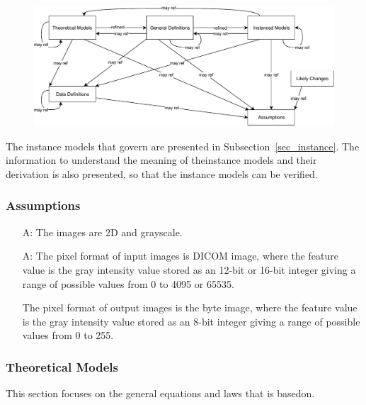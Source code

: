 \documentclass[12pt]{article}
\begin{document}
\begin{figure}[H]
  \includegraphics[scale=0.9]{RelationsBetweenTM_GD_IM_DD_A.pdf}
\end{figure}

The instance models that govern \progname{} are presented in
Subsection~\ref{sec_instance}. The information to understand the meaning of
theinstance models and their derivation is also presented, so that the instance
models can be verified.

\subsubsection{Assumptions}
\label{sec_assumpt}

\begin{itemize}

\item[A\refstepcounter{assumpnum}\theassumpnum \label{A_2Dgrayscale}:]
The images are 2D and grayscale.

\item[A\refstepcounter{assumpnum}\theassumpnum \label{A_8bitinteger}:]
The pixel format of input images is DICOM image, where the feature value is the
gray intensity value stored as an 12-bit or 16-bit integer giving a range of
possible values from 0 to 4095 or 65535.

The pixel format of output images is the byte image, where the feature value is
the gray intensity value stored as an 8-bit integer giving a range of possible
values from 0 to 255.

\end{itemize}

\subsubsection{Theoretical Models} \label{sec_theoretical}

This section focuses on the general equations and laws that \progname{} is
basedon.
\end{document}
